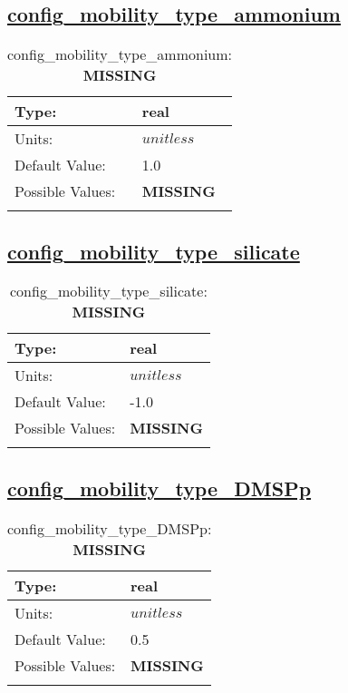 \subsection[config\_mobility\_type\_ammonium]{\hyperref[sec:nm_tab_biogeochemistry]{config\_mobility\_type\_ammonium}}
\label{subsec:nm_sec_config_mobility_type_ammonium}
\begin{center}
\begin{longtable}{| p{2.0in} || p{4.0in} |}
    \hline
    Type: & real \\
    \hline
    Units: & $unitless$ \\
    \hline
    Default Value: & 1.0 \\
    \hline
    Possible Values: & {\bf \color{red} MISSING} \\
    \hline
    \caption{config\_mobility\_type\_ammonium: {\bf \color{red} MISSING}}
\end{longtable}
\end{center}
\subsection[config\_mobility\_type\_silicate]{\hyperref[sec:nm_tab_biogeochemistry]{config\_mobility\_type\_silicate}}
\label{subsec:nm_sec_config_mobility_type_silicate}
\begin{center}
\begin{longtable}{| p{2.0in} || p{4.0in} |}
    \hline
    Type: & real \\
    \hline
    Units: & $unitless$ \\
    \hline
    Default Value: & -1.0 \\
    \hline
    Possible Values: & {\bf \color{red} MISSING} \\
    \hline
    \caption{config\_mobility\_type\_silicate: {\bf \color{red} MISSING}}
\end{longtable}
\end{center}
\subsection[config\_mobility\_type\_DMSPp]{\hyperref[sec:nm_tab_biogeochemistry]{config\_mobility\_type\_DMSPp}}
\label{subsec:nm_sec_config_mobility_type_DMSPp}
\begin{center}
\begin{longtable}{| p{2.0in} || p{4.0in} |}
    \hline
    Type: & real \\
    \hline
    Units: & $unitless$ \\
    \hline
    Default Value: & 0.5 \\
    \hline
    Possible Values: & {\bf \color{red} MISSING} \\
    \hline
    \caption{config\_mobility\_type\_DMSPp: {\bf \color{red} MISSING}}
\end{longtable}
\end{center}
